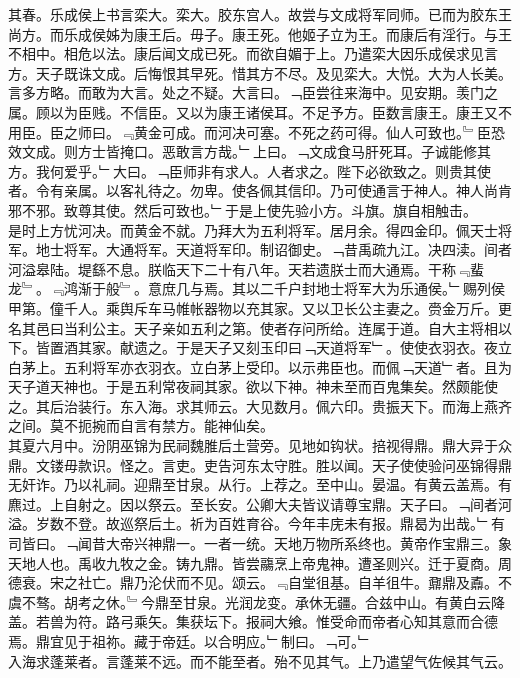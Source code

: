 \documentclass{zhvt-classic}
\begin{document}
\hspace*{2em}其春。乐成侯上书言栾大。栾大。胶东宫人。故尝与文成将军同师。已而为胶东王尚方。而乐成侯姊为康王后。毋子。康王死。他姬子立为王。而康后有淫行。与王不相中。相危以法。康后闻文成已死。而欲自媚于上。乃遣栾大因乐成侯求见言方。天子既诛文成。后悔恨其早死。惜其方不尽。及见栾大。大悦。大为人长美。言多方略。而敢为大言。处之不疑。大言曰。﹁臣尝往来海中。见安期。羡门之属。顾以为臣贱。不信臣。又以为康王诸侯耳。不足予方。臣数言康王。康王又不用臣。臣之师曰。﹃黄金可成。而河决可塞。不死之药可得。仙人可致也。﹄臣恐效文成。则方士皆掩口。恶敢言方哉。﹂上曰。﹁文成食马肝死耳。子诚能修其方。我何爱乎。﹂大曰。﹁臣师非有求人。人者求之。陛下必欲致之。则贵其使者。令有亲属。以客礼待之。勿卑。使各佩其信印。乃可使通言于神人。神人尚肯邪不邪。致尊其使。然后可致也。﹂于是上使先验小方。斗旗。旗自相触击。\\
\hspace*{2em}是时上方忧河决。而黄金不就。乃拜大为五利将军。居月余。得四金印。佩天士将军。地士将军。大通将军。天道将军印。制诏御史。﹁昔禹疏九江。决四渎。间者河溢皋陆。堤繇不息。朕临天下二十有八年。天若遗朕士而大通焉。干称﹃蜚龙﹄。﹃鸿渐于般﹄。意庶几与焉。其以二千户封地士将军大为乐通侯。﹂赐列侯甲第。僮千人。乘舆斥车马帷帐器物以充其家。又以卫长公主妻之。赍金万斤。更名其邑曰当利公主。天子亲如五利之第。使者存问所给。连属于道。自大主将相以下。皆置酒其家。献遗之。于是天子又刻玉印曰﹁天道将军﹂。使使衣羽衣。夜立白茅上。五利将军亦衣羽衣。立白茅上受印。以示弗臣也。而佩﹁天道﹂者。且为天子道天神也。于是五利常夜祠其家。欲以下神。神未至而百鬼集矣。然颇能使之。其后治装行。东入海。求其师云。大见数月。佩六印。贵振天下。而海上燕齐之间。莫不扼捥而自言有禁方。能神仙矣。\\
\hspace*{2em}其夏六月中。汾阴巫锦为民祠魏脽后土营旁。见地如钩状。掊视得鼎。鼎大异于众鼎。文镂毋款识。怪之。言吏。吏告河东太守胜。胜以闻。天子使使验问巫锦得鼎无奸诈。乃以礼祠。迎鼎至甘泉。从行。上荐之。至中山。晏温。有黄云盖焉。有麃过。上自射之。因以祭云。至长安。公卿大夫皆议请尊宝鼎。天子曰。﹁间者河溢。岁数不登。故巡祭后土。祈为百姓育谷。今年丰庑未有报。鼎曷为出哉。﹂有司皆曰。﹁闻昔大帝兴神鼎一。一者一统。天地万物所系终也。黄帝作宝鼎三。象天地人也。禹收九牧之金。铸九鼎。皆尝鬺烹上帝鬼神。遭圣则兴。迁于夏商。周德衰。宋之社亡。鼎乃沦伏而不见。颂云。﹃自堂徂基。自羊徂牛。鼐鼎及鼒。不虞不骜。胡考之休。﹄今鼎至甘泉。光润龙变。承休无疆。合兹中山。有黄白云降盖。若兽为符。路弓乘矢。集获坛下。报祠大飨。惟受命而帝者心知其意而合德焉。鼎宜见于祖祢。藏于帝廷。以合明应。﹂制曰。﹁可。﹂\\
\hspace*{2em}入海求蓬莱者。言蓬莱不远。而不能至者。殆不见其气。上乃遣望气佐候其气云。\\
\end{document}

